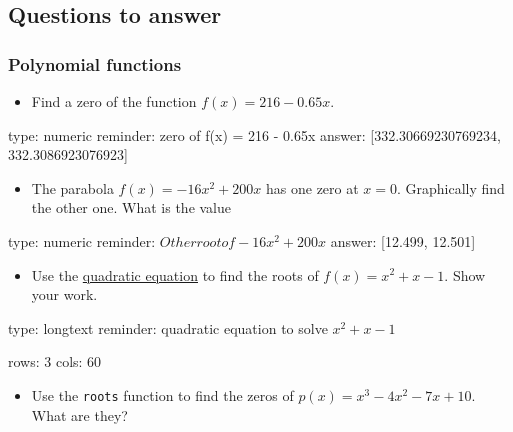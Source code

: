 \documentclass[12pt]{article}
\begin{document}
\subsection{Questions to answer}

\subsubsection{Polynomial functions}

\begin{itemize}
\itemsep1pt\parskip0pt
\item
  Find a zero of the function $f(x) = 216 - 0.65x$.
\end{itemize}

\begin{answer}
    type: numeric
    reminder: zero of f(x) = 216 - 0.65x
    answer: [332.30669230769234, 332.3086923076923]

\end{answer}

\begin{itemize}
\itemsep1pt\parskip0pt
\item
  The parabola $f(x) = -16x^2 + 200x$ has one zero at $x=0$. Graphically
  find the other one. What is the value
\end{itemize}

\begin{answer}
    type: numeric
    reminder: \(Other root of -16x^2 + 200x\)
    answer: [12.499, 12.501]

\end{answer}

\begin{itemize}
\itemsep1pt\parskip0pt
\item
  Use the
  \href{http://en.wikipedia.org/wiki/Quadratic_equation}{quadratic
  equation} to find the roots of $f(x) = x^2 + x - 1$. Show your work.
\end{itemize}

\begin{answer}
type: longtext
reminder: quadratic equation to solve \(x^2 + x - 1\)

rows: 3
cols: 60
\end{answer}

\begin{itemize}
\itemsep1pt\parskip0pt
\item
  Use the \texttt{roots} function to find the zeros of
  $p(x)=x^3 -4x^2 -7x + 10$. What are they?
\end{itemize}
\end{document}
